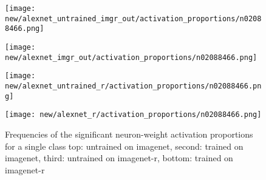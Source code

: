\documentclass{article}
\begin{document}
            \begin{figure}[H]
                \centering
                \begin{minipage}{\textwidth}
                    \centering
                    \texttt{[image: new/alexnet\_untrained\_imgr\_out/activation\_proportions/n02088466.png]}
                    
                \end{minipage}\hfill
                \begin{minipage}{\textwidth}
                    \centering
                    \texttt{[image: new/alexnet\_imgr\_out/activation\_proportions/n02088466.png]}
                \end{minipage}
                \begin{minipage}{\textwidth}
                    \centering
                    \texttt{[image: new/alexnet\_untrained\_r/activation\_proportions/n02088466.png]}
                    
                \end{minipage}\hfill
                \begin{minipage}{\textwidth}
                    \centering
                    \texttt{[image: new/alexnet\_r/activation\_proportions/n02088466.png]}
                \end{minipage}
                
                \caption{Frequencies of the significant neuron-weight activation proportions for a single class top: untrained on imagenet, second: trained on imagenet, third: untrained on imagenet-r, bottom: trained on imagenet-r}
                \label{fig:frequency_neuron_weight1}
            \end{figure}
            
                    
                    
\end{document}
